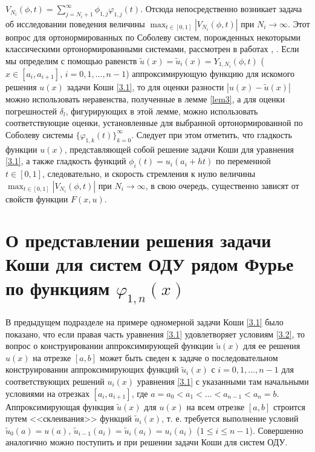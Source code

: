 $V_{N_i}(\phi,t)=\sum\nolimits_{j=N_i+1}^\infty \hat \phi_{1,j}\varphi_{1,j}(t)$. Отсюда непосредственно возникает задача об исследовании поведения величины $\max_{t\in[0,1]}|V_{N_i}(\phi,t)|$ при $N_i\to\infty$.  Этот вопрос  для   ортонормированных по Соболеву систем, порожденных некоторыми классическими ортонормированными системами, рассмотрен в работах  \cite{Shar11,Shar2003,Shar2006,Shar2008,Shar19,Shar18,sharap3,Shar_Dag_Elec,SHII,Shar2017,SharSMJ2017}, \cite{SharIzv2018}.
Если мы определим  с помощью равенств $\tilde u(x)=\tilde u_i(x)=Y_{1,N_i}(\phi, t)$  ($x\in [a_i,a_{i+1}]$, $i=0,1,\ldots, n-1$)  аппроксимирующую функцию для искомого решения $u(x)$  задачи Коши \eqref{3.1}, то для оценки  разности $|u(x)-\tilde u(x)|$  можно использовать неравенства, полученные в лемме \ref{lem3}, а для оценки погрешностей $\delta_l$, фигурирующих в этой лемме, можно использовать соответствующие оценки, установленные для выбранной ортонормированной по Соболеву системы $\{\varphi_{1,k}(t)\}_{k=0}^\infty$. Следует при этом отметить, что гладкость функции $u(x)$, представляющей собой решение задачи Коши для уравнения \eqref{3.1}, а также   гладкость функций $\phi_i(t)=u_i(a_i+ht)$ по переменной  $t\in[0,1]$,  следовательно, и скорость стремления к нулю величины $\max_{t\in[0,1]}|V_{N_i}(\phi,t)|$ при $N_i\to\infty$,  в свою очередь, существенно зависят от свойств функции $F(x,u)$.


\section{О представлении решения задачи Коши для систем ОДУ рядом Фурье по функциям $\varphi_{1,n}(x)$}\label{CauchyProblemSolutionRepr}
В предыдущем подразделе на примере одномерной задачи Коши \eqref{3.1} было показано, что если правая часть уравнения \eqref{3.1} удовлетворяет условиям \eqref{3.2}, то вопрос о конструировании аппроксимирующей функции $\tilde u(x)$ для ее решения $u(x)$ на отрезке $[a,b]$ может быть  сведен к задаче о последовательном  конструировании аппроксимирующих функций $\tilde u_i(x)$ с $i=0, 1,\ldots, n-1$ для соответствующих   решений $u_i(x)$ уравнения \eqref{3.1} с указанными там начальными условиями на  отрезках $[a_i,a_{i+1}]$, где $a=a_0<a_1<\ldots<a_{n-1}<a_n=b$. Аппроксимирующая функция $\tilde u(x)$ для $u(x)$ на всем отрезке $[a,b]$ строится путем <<склеивания>> функций $\tilde u_i(x)$, т. е. требуется выполнение условий $\tilde u_0(a)=u(a)$,
$\tilde u_{i-1}(a_i)=\tilde u_i(a_i)=u_i(a_i)$ ($1\le i\le n-1$). Совершенно аналогично можно поступить и при решении задачи Коши для систем ОДУ.

